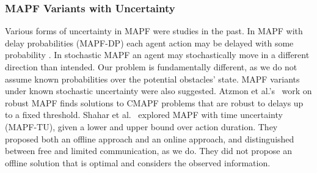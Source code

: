 \documentclass[letterpaper]{article} %
\begin{document}
\subsubsection{MAPF Variants with Uncertainty}
Various forms of uncertainty in MAPF were studies in the past.
In MAPF with delay probabilities (MAPF-DP) each agent action may be delayed with some probability \cite{wagner2017path,honig2016multi,atzmon2020probabilistic}. In stochastic MAPF
\cite{levy2022online} an agent may stochastically move in a different direction than intended.
Our problem is fundamentally different, as we do not assume known probabilities over the potential obstacles' state.
MAPF variants under known stochastic uncertainty were also suggested.
Atzmon et al.'s~ work on robust MAPF finds solutions to CMAPF problems that are robust to delays up to  a fixed threshold.
Shahar et al.~ explored MAPF with time uncertainty (MAPF-TU), given a lower and upper bound over action duration. They proposed both an offline approach and an online approach, and distinguished between free and limited communication, as we do.
They did not propose an offline solution that is optimal and considers the observed information.
\end{document}
